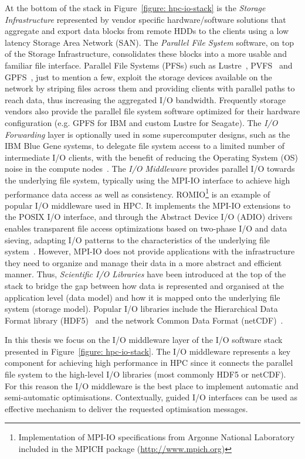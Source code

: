 At the bottom of the stack in Figure~\ref{figure: hpc-io-stack} is the \textit{Storage Infrastructure} represented by vendor specific hardware/software solutions that aggregate and export data blocks from remote HDDs to the clients using a low latency Storage Area Network (SAN). The \textit{Parallel File System} software, on top of the Storage Infrastructure, consolidates these blocks into a more usable and familiar file interface. Parallel File Systems (PFSs) such as Lustre~\cite{Braam02}, PVFS~\cite{CarnsLRT} and GPFS~\cite{SchmuckH02}, just to mention a few, exploit the storage devices available on the network by striping files across them and providing clients with parallel paths to reach data, thus increasing the aggregated I/O bandwidth. Frequently storage vendors also provide the parallel file system software optimized for their hardware configuration (e.g. GPFS for IBM and custom Lustre for Seagate). The \textit{I/O Forwarding} layer is optionally used in some supercomputer designs, such as the IBM Blue Gene systems, to delegate file system access to a limited number of intermediate I/O clients, with the benefit of reducing the Operating System (OS) noise in the compute nodes~\cite{AliCIKLLRWS09}. The \textit{I/O Middleware} provides parallel I/O towards the underlying file system, typically using the MPI-IO interface to achieve high performance data access as well as consistency. ROMIO\footnote{Implementation of MPI-IO specifications from Argonne National Laboratory included in the MPICH package (\url{http://www.mpich.org})} is an example of popular I/O middleware used in HPC. It implements the MPI-IO extensions to the POSIX I/O interface, and through the Abstract Device I/O  (ADIO) drivers~\cite{ThakurGL96} enables transparent file access optimizations based on two-phase I/O and data sieving, adapting I/O patterns to the characteristics of the underlying file system~\cite{ThakurGL99}. However, MPI-IO does not provide applications with the infrastructure they need to organize and manage their data in a more abstract and efficient manner. Thus, \textit{Scientific I/O Libraries} have been introduced at the top of the stack to bridge the gap between how data is represented and organised at the application level (data model) and how it is mapped onto the underlying file system (storage model). Popular I/O libraries include the Hierarchical Data Format library (HDF5)~\cite{hdf5} and the network Common Data Format (netCDF)~\cite{netcdf}.

In this thesis we focus on the I/O middleware layer of the I/O software stack presented in Figure~\ref{figure: hpc-io-stack}. The I/O middleware represents a key component for achieving high performance in HPC since it connects the parallel file system to the high-level I/O libraries (most commonly HDF5 or netCDF). For this reason the I/O middleware is the best place to implement automatic and semi-automatic optimisations. Contextually, guided I/O interfaces can be used as effective mechanism to deliver the requested optimisation messages.

